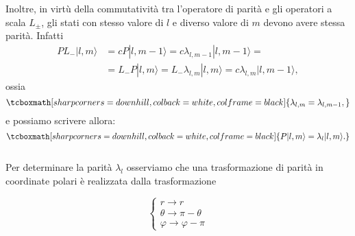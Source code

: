 \documentclass[a4paper,12pt,oneside]{book}
\begin{document}
Inoltre, in virtù della commutatività tra l'operatore di parità e gli operatori a scala $L_{\pm}$, gli stati con stesso valore di $l$ e diverso valore di $m$ devono avere stessa parità. Infatti
	\begin{align}
		 PL_-|l,m\rangle &=   cP|l,m-1\rangle=c\lambda_{l,m-1}|l,m-1\rangle=  \nonumber \\
		&=   L_-P|l,m\rangle=L_- \lambda_{l,m}|l,m\rangle=c\lambda_{l,m}|l,m-1\rangle ,
	\end{align}
ossia
	\begin{equation} 
		\tcboxmath[sharp corners=downhill, colback=white, colframe=black]{
			\lambda_{l,m}=\lambda_{l,m-1},
			}
	\end{equation}
e possiamo scrivere allora:
	\begin{equation} 
		\tcboxmath[sharp corners=downhill, colback=white, colframe=black]{
			P|l,m\rangle=\lambda_l|l,m \rangle.
			}
	\end{equation}\\
	
Per determinare la parità $\lambda_l$ osserviamo che una trasformazione di parità in coordinate polari è realizzata dalla trasformazione 

\begin{center}
\begin{minipage}[c]{0.35\textwidth}
\centering
\begin{equation}
\begin{cases} \nonumber
r \to r \\
\theta \to \pi-\theta \\
\varphi \to \varphi-\pi
\end{cases}
\end{equation}
\end{minipage}
\begin{minipage}{0.50\textwidth}
\centering
{}
%
%
\end{minipage}
\end{center}
\end{document}
